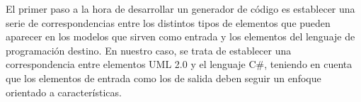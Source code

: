 

El primer paso a la hora de desarrollar un generador de código es establecer una serie de correspondencias entre los distintos tipos de elementos que pueden aparecer en los modelos que sirven como entrada y los elementos del lenguaje de programación destino. En nuestro caso, se trata de establecer una correspondencia entre elementos UML 2.0 y el lenguaje C\#, teniendo en cuenta que los elementos de entrada como los de salida deben seguir un enfoque orientado a características.


